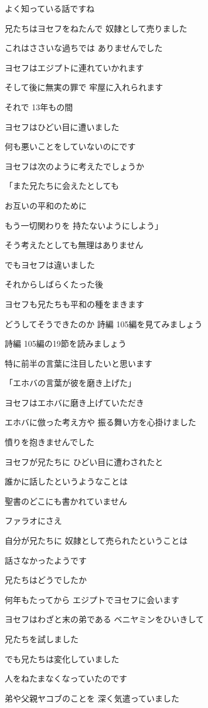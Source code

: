 \documentclass[twocolumn]{jsarticle}
\begin{document}
よく知っている話ですね

兄たちはヨセフをねたんで
奴隷として売りました

これはささいな過ちでは
ありませんでした

ヨセフはエジプトに連れていかれます

そして後に無実の罪で
牢屋に入れられます

それで 13年もの間

ヨセフはひどい目に遭いました

何も悪いことをしていないのにです

ヨセフは次のように考えたでしょうか

「また兄たちに会えたとしても

お互いの平和のために

もう一切関わりを
持たないようにしよう」

そう考えたとしても無理はありません

でもヨセフは違いました

それからしばらくたった後

ヨセフも兄たちも平和の種をまきます

どうしてそうできたのか
詩編 105編を見てみましょう

詩編 105編の19節を読みましょう

特に前半の言葉に注目したいと思います

「エホバの言葉が彼を磨き上げた」

ヨセフはエホバに磨き上げていただき

エホバに倣った考え方や
振る舞い方を心掛けました

憤りを抱きませんでした

ヨセフが兄たちに
ひどい目に遭わされたと

誰かに話したというようなことは

聖書のどこにも書かれていません

ファラオにさえ

自分が兄たちに
奴隷として売られたということは

話さなかったようです

兄たちはどうでしたか

何年もたってから
エジプトでヨセフに会います

ヨセフはわざと末の弟である
ベニヤミンをひいきして

兄たちを試しました

でも兄たちは変化していました

人をねたまなくなっていたのです

弟や父親ヤコブのことを
深く気遣っていました
\end{document}
